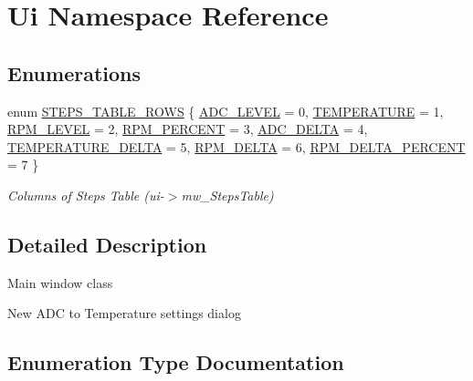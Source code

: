 \hypertarget{namespace_ui}{}\section{Ui Namespace Reference}
\label{namespace_ui}
\subsection*{Enumerations}
\begin{DoxyCompactItemize}
\item 
enum \hyperlink{namespace_ui_ab417c7821a7da9a52d574ee5e2ecf6f0}{S\+T\+E\+P\+S\+\_\+\+T\+A\+B\+L\+E\+\_\+\+R\+O\+WS} \{ \newline
\hyperlink{namespace_ui_ab417c7821a7da9a52d574ee5e2ecf6f0a3ce827b16c92c4223079c8f5e81ae264}{A\+D\+C\+\_\+\+L\+E\+V\+EL} = 0, 
\hyperlink{namespace_ui_ab417c7821a7da9a52d574ee5e2ecf6f0a95e4957d31702a84bca284e48318efd1}{T\+E\+M\+P\+E\+R\+A\+T\+U\+RE} = 1, 
\hyperlink{namespace_ui_ab417c7821a7da9a52d574ee5e2ecf6f0ac6f609b55b214ac58aa0b2f702a3244f}{R\+P\+M\+\_\+\+L\+E\+V\+EL} = 2, 
\hyperlink{namespace_ui_ab417c7821a7da9a52d574ee5e2ecf6f0a25e4220b0ee49ef66eb7c76fae978aa6}{R\+P\+M\+\_\+\+P\+E\+R\+C\+E\+NT} = 3, 
\newline
\hyperlink{namespace_ui_ab417c7821a7da9a52d574ee5e2ecf6f0aa34e92bd0beb0f4723495c66ce9c676e}{A\+D\+C\+\_\+\+D\+E\+L\+TA} = 4, 
\hyperlink{namespace_ui_ab417c7821a7da9a52d574ee5e2ecf6f0a7d1306709fbe1b5d00d6792f3a1e9ae1}{T\+E\+M\+P\+E\+R\+A\+T\+U\+R\+E\+\_\+\+D\+E\+L\+TA} = 5, 
\hyperlink{namespace_ui_ab417c7821a7da9a52d574ee5e2ecf6f0aa810bf7a4e77e6c834b2bf7f956429ac}{R\+P\+M\+\_\+\+D\+E\+L\+TA} = 6, 
\hyperlink{namespace_ui_ab417c7821a7da9a52d574ee5e2ecf6f0af4e0e9ab0dbab7f2cad423ad7f315d1b}{R\+P\+M\+\_\+\+D\+E\+L\+T\+A\+\_\+\+P\+E\+R\+C\+E\+NT} = 7
 \}\begin{DoxyCompactList}\small\item\em Columns of Steps Table (ui-\/$>$mw\+\_\+\+Steps\+Table) \end{DoxyCompactList}
\end{DoxyCompactItemize}


\subsection{Detailed Description}
Main window class

New A\+DC to Temperature settings dialog 

\subsection{Enumeration Type Documentation}
\mbox{\label{namespace_ui_ab417c7821a7da9a52d574ee5e2ecf6f0}} 
